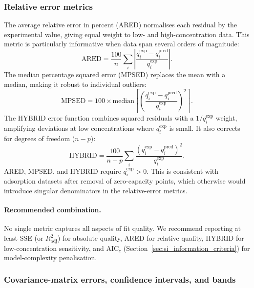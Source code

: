 \documentclass[journal=jacsat,manuscript=article]{achemso}
\begin{document}
\subsubsection{Relative error metrics}

The average relative error in percent (ARED) normalises each residual
by the experimental value, giving equal weight to low- and
high-concentration data.  This metric is particularly informative when
data span several orders of magnitude:
\begin{equation}
	\text{ARED} = \frac{100}{n}\sum_{i}
	\left|\frac{q_i^{\exp} - q_i^{\mathrm{pred}}}{q_i^{\exp}}\right|.
	\label{eq:si_ARED}
\end{equation}
The median percentage squared error (MPSED) replaces the mean with a
median, making it robust to individual outliers:
\begin{equation}
	\text{MPSED} = 100 \times \mathrm{median}\!\left[
	\left(\frac{q_i^{\exp} - q_i^{\mathrm{pred}}}{q_i^{\exp}}\right)^{\!2}
	\right].
	\label{eq:si_MPSED}
\end{equation}
The HYBRID error function combines squared residuals with a $1/q_i^{\exp}$
weight, amplifying deviations at low concentrations where
$q_i^{\exp}$ is small.  It also corrects for degrees of freedom ($n - p$):
\begin{equation}
	\text{HYBRID} = \frac{100}{n-p}\sum_{i}
	\frac{(q_i^{\exp} - q_i^{\mathrm{pred}})^2}{q_i^{\exp}}.
	\label{eq:si_HYBRID}
\end{equation}
ARED, MPSED, and HYBRID require $q_i^{\exp} > 0$. This is consistent
with adsorption datasets after removal of zero-capacity points, which
otherwise would introduce singular denominators in the relative-error
metrics.

\paragraph{Recommended combination.}
No single metric captures all aspects of fit quality.  We recommend
reporting at least SSE (or $R^2_{\mathrm{adj}}$) for absolute quality,
ARED for relative quality, HYBRID for low-concentration sensitivity,
and AIC$_c$ (Section~\ref{sec:si_information_criteria}) for
model-complexity penalisation.

\subsubsection{Covariance-matrix errors, confidence intervals, and bands}
\end{document}
